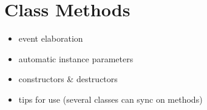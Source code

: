 \section{Class Methods}
\label{sec:classdiagrams-methods}

\begin{itemize}

	\item event elaboration

	\item automatic instance parameters

	\item constructors \& destructors

	\item tips for use (several classes can sync on methods)

\end{itemize}